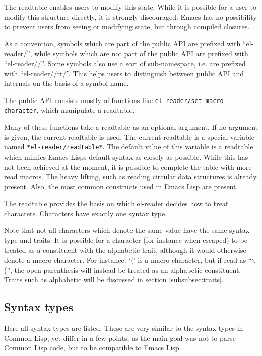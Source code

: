 \documentclass[a4paper]{article}
\newcommand{\el}{Emacs Lisp}
\newcommand{\cl}{Common Lisp}
\newcommand{\elr}{el-reader}
\newcommand{\sym}[1]{\texttt{#1}}
\newcommand{\fun}[1]{\texttt{#1}}
\begin{document}
The readtable enables users to modify this state.  While it is possible for a
user to modify this structure directly, it is strongly discouraged.  Emacs has
no possibility to prevent users from seeing or modifying state, but through
compiled closures.

As a convention, symbols which are part of the public API are prefixed with
``el-reader/'', while symbols which are not part of the public API are prefixed
with ``el-reader//''.  Some symbols also use a sort of sub-namespace, i.e. are
prefixed with ``el-reader//rt/''.  This helps users to distinguish between
public API and internals on the basis of a symbol name.

The public API consists mostly of functions like
\fun{el-reader/set-macro-character}, which manipulate a readtable.

Many of these functions take a readtable as an optional argument.  If no
argument is given, the current readtable is used.  The current readtable is a
special variable named \sym{*el-reader/readtable*}.  The default value of this
variable is a readtable which mimics \el{}s default syntax as closely as
possible.  While this has not been achieved at the moment, it is possible to
complete the table with more read macros.  The heavy lifting, such as reading
circular data structures is already present.  Also, the most common constructs
used in \el{} are present.  

The readtable provides the basis on which \elr{} decides how to treat
characters.  Characters have exactly one syntax type.

Note that not all characters which denote the same value have the same syntax
type and traits.  It is possible for a character (for instance when escaped) to
be treated as a constituent with the alphabetic trait, although it would
otherwise denote a macro character.  For instance: `(' is a macro character, but
if read as ``$\backslash$('', the open parenthesis will instead be treated as an
alphabetic constituent.  Traits such as alphabetic will be discussed in section
\ref{subsubsec:traits}.

\subsection{Syntax types}
\label{subsec:syntax-types}

Here all syntax types are listed.  These are very similar to the syntax types in
\cl{}, yet differ in a few points, as the main goal was not to parse \cl{} code,
but to be compatible to \el{}.
\end{document}

